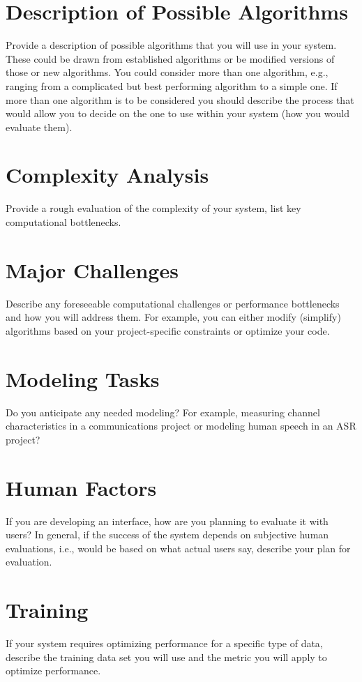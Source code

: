 \documentclass{article}
\begin{document}
\section{Description of Possible Algorithms}
Provide a description of possible algorithms that you will use in your system. These could be drawn from established algorithms or be modified versions of those or new algorithms. You could consider more than one algorithm, e.g., ranging from a complicated but best performing algorithm to a simple one. If more than one algorithm is to be considered you should describe the process that would allow you to decide on the one to use within your system (how you would evaluate them). 
 
\section{Complexity Analysis}
 Provide a rough evaluation of the complexity of your system, list key computational bottlenecks. 

\section{Major Challenges}
Describe any foreseeable computational challenges or performance bottlenecks and how you will address them. For example, you can either modify (simplify) algorithms based on your project-specific constraints or optimize your code.

\section{Modeling Tasks}
Do you anticipate any needed modeling? For example, measuring channel characteristics in a communications project or modeling human speech in an ASR project?

\section{Human Factors}
If you are developing an interface, how are you planning to evaluate it with users? In general, if the success of the system depends on subjective human evaluations, i.e., would be based on what actual users say, describe your plan for evaluation. 

\section{Training}
If your system requires optimizing performance for a specific type of data, describe the training data set you will use and the metric you will apply to optimize performance. 
\end{document}

